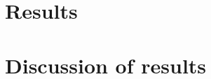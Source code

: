 \documentclass{report}
\begin{document}
\section{Results}




\section{Discussion of results}
\end{document}
